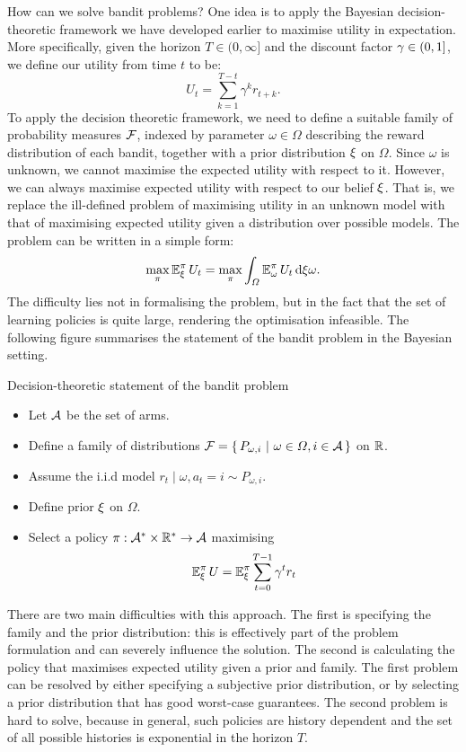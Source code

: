 How can we solve bandit problems? One idea is to apply the Bayesian
decision-theoretic framework we have developed earlier to maximise
utility in expectation.  More specifically, given the horizon $T
\in (0, \infty]$ and the discount factor $\gamma \in (0,1]$, we
define our utility from time $t$ to be:
\begin{equation}
  \label{eq:reward-utility}
  U_t = \sum_{k=1}^{T-t} \gamma^k r_{t+k}.
\end{equation}
To apply the decision theoretic framework, we need to define a suitable family of probability measures $\mathcal{F}$, indexed by parameter $\omega \in \Omega$ describing the reward distribution of each bandit, together with a prior distribution $\xi$ on $\Omega$. Since $\omega$ is unknown, we cannot maximise the expected utility with respect to it. However, we can always maximise expected utility with respect to our belief $\xi$. That is, we replace the ill-defined problem of maximising utility in an unknown model with that of maximising expected utility given a distribution over possible models. The problem can be written in a simple form:
\begin{equation}
  \label{eq:bel-reward-utility}
  \max_\pi \mathop{\mbox{\ensuremath{\mathbb{E}}}}\nolimits_\xi^\pi U_t = 
  \max_\pi \int_\Omega \mathop{\mbox{\ensuremath{\mathbb{E}}}}\nolimits_\omega^\pi U_t \,\mathrm{d} \xi{\omega}.
\end{equation}
The difficulty lies not in formalising the problem, but in the fact that the set of learning policies is quite large, rendering the optimisation infeasible.
The following figure summarises the statement of the bandit problem in the Bayesian setting.
\begin{block}{Decision-theoretic statement of the bandit problem}
  \begin{itemize}
  \item Let ${\mathcal{A}}$ be the set of arms.
  \item Define a family of distributions $\mathcal{F} = \left\{\, P_{\omega, i} ~\middle|~ \omega \in \Omega, i \in {\mathcal{A}} \,\right\}$ on ${\mathbb{R}}$.
  \item Assume the i.i.d model $r_t \mid \omega, a_t = i \sim P_{\omega, i}$.
  \item Define prior $\xi$ on $\Omega$.
  \item Select a policy $\pi : {\mathcal{A}}^* \times {\mathbb{R}}^* \to {\mathcal{A}}$ maximising
    \[
    \mathop{\mbox{\ensuremath{\mathbb{E}}}}\nolimits^\pi_\xi U = \mathop{\mbox{\ensuremath{\mathbb{E}}}}\nolimits^\pi_\xi \sum_{t=0}^{T - 1} \gamma^t r_{t}
    \]
  \end{itemize}
\end{block}
There are two main difficulties with this approach. The first is specifying the family and the prior distribution: this is effectively part of the problem formulation and can severely influence the solution. The second is calculating the policy that maximises expected utility given a prior and family. The first problem can be resolved by either specifying a subjective prior distribution, or by selecting a prior distribution that has good worst-case guarantees. The second problem is hard to solve, because in general, such policies are history dependent and the set of all possible histories is exponential in the horizon $T$.

